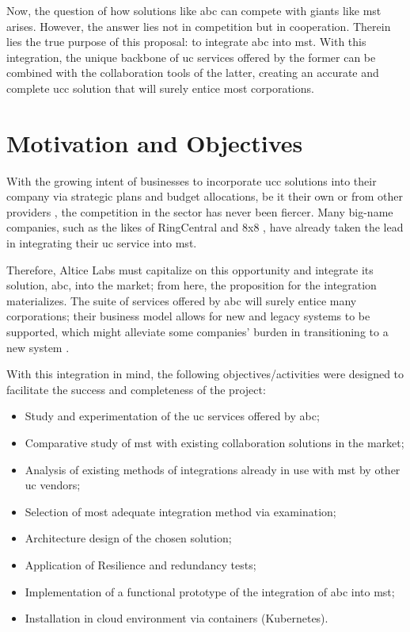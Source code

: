 Now, the question of how solutions like \gls{abc} can compete with giants like \gls{mst} arises. However, the answer lies not in competition but in cooperation. Therein lies the true purpose of this proposal: to integrate \gls{abc} into \gls{mst}. With this integration, the unique backbone of \gls{uc} services offered by the former can be combined with the collaboration tools of the latter, creating an accurate and complete \gls{ucc} solution that will surely entice most corporations.

\section{Motivation and Objectives}

With the growing intent of businesses to incorporate \gls{ucc} solutions into their company via strategic plans and budget allocations, be it their own or from other providers \citep{Alias2018}, the competition in the sector has never been fiercer. Many big-name companies, such as the likes of RingCentral \citep{ringcentralAdvancedPhone} and 8x8 \citep{8x8VoiceMicrosoft}, have already taken the lead in integrating their \gls{uc} service into \gls{mst}.

Therefore, Altice Labs must capitalize on this opportunity and integrate its solution, \gls{abc}, into the market; from here, the proposition for the integration materializes. The suite of services offered by \gls{abc} will surely entice many corporations; their business model allows for new and legacy systems to be supported, which might alleviate some companies' burden in transitioning to a new system \citep{Alias2019}.

With this integration in mind, the following objectives/activities were designed to facilitate the success and completeness of the project:

\begin{itemize}
    \item Study and experimentation of the \gls{uc} services offered by \gls{abc};

    \item Comparative study of \gls{mst} with existing collaboration solutions in the market;

    \item Analysis of existing methods of integrations already in use with \gls{mst} by other \gls{uc} vendors;

    \item Selection of most adequate integration method via examination;

    \item Architecture design of the chosen solution;

    \item Application of Resilience and redundancy tests;

    \item Implementation of a functional prototype of the integration of \gls{abc} into \gls{mst};

    \item Installation in cloud environment via containers (Kubernetes).
    
\end{itemize}

